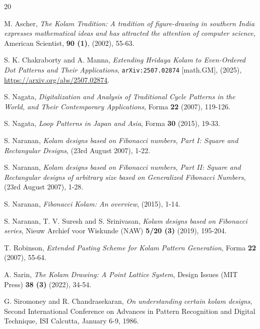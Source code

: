 \documentclass[12pt,a4paper]{article}
\theoremstyle{remark} %
\theoremstyle{example} %
\theoremstyle{proposition}
\begin{document}
\begin{thebibliography}{20}




         {\sc M. Ascher},
         {\it The Kolam Tradition: A tradition of figure-drawing in southern India expresses mathematical ideas and has attracted the attention of computer science},
         {American Scientist}, {\bf90 (1)}, (2002), 55-63.

         {\sc S. K. Chakraborty and A. Manna},
         {\it Extending Hridaya Kolam to Even-Ordered Dot Patterns and Their Applications},
         {\tt arXiv:2507.02874} [math.GM], (2025), \url{https://arxiv.org/abs/2507.02874}.

         
         {\sc S. Nagata},
         {\it Digitalization and Analysis of Traditional Cycle Patterns in the World, and Their Contemporary Applications},
         {Forma} {\bf 22} (2007), 119-126.

         {\sc S. Nagata},
         {\it Loop Patterns in Japan and Asia},
         {Forma} {\bf 30} (2015), 19-33.

         {\sc S. Naranan},
         {\it Kolam designs based on Fibonacci numbers, Part I: Square and Rectangular Designs},
         {} {\bf} (23rd August 2007), 1-22.

         {\sc S. Naranan},
         {\it Kolam designs based on Fibonacci numbers, Part II: Square and Rectangular designs of arbitrary size based on Generalized Fibonacci Numbers},
         {} {\bf} (23rd August 2007), 1-28.

         {\sc S. Naranan},
         {\it Fibonacci Kolam: An overview},
         {} {\bf} (2015), 1-14.

         {\sc S. Naranan, T. V. Suresh and S. Srinivasan},
         {\it Kolam designs based on Fibonacci series},
         {Nieuw Archief voor Wiskunde (NAW)} {\bf 5/20 (3)} (2019), 195-204.

         {\sc T. Robinson},
         {\it Extended Pasting Scheme for Kolam Pattern Generation},
         {Forma} {\bf 22} (2007), 55-64.

         {\sc A. Sarin},
         {\it The Kolam Drawing: A Point Lattice System},
         {Design Issues (MIT Press)} {\bf 38 (3)} (2022), 34-54.

         {\sc G. Siromoney and R. Chandrasekaran},
         {\it On understanding certain kolam designs},
         {Second International Conference on Advances in Pattern Recognition and Digital Technique}, ISI Calcutta, January 6-9, 1986.


\end{thebibliography}
\end{document}
